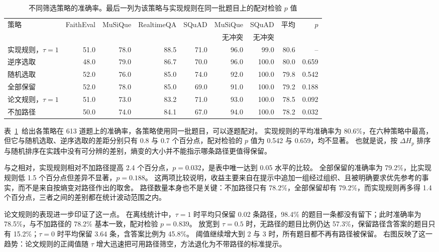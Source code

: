 \begin{table}[htbp]
  \centering
  \footnotesize
  \setlength{\tabcolsep}{4pt}
  \renewcommand{\arraystretch}{1.3}
  \caption{不同筛选策略的准确率。最后一列为该策略与实现规则在同一批题目上的配对检验 $p$ 值}
  \label{tab:cl-e2}
  \begin{tabular}{lrrrrrrrr}
    \toprule
    策略 & FaithEval & MuSiQue & RealtimeQA & SQuAD & MuSiQue & SQuAD & 平均 & $p$ \\
         &          &         &          &       & 无冲突  & 无冲突 &      &     \\
    \midrule
    实现规则，$\tau=1$ & 51.0 & 78.0 & 88.5 & 71.0 & 96.0 & 99.0 & 80.6 & -- \\
    逆序选取           & 48.0 & 79.0 & 86.7 & 70.0 & 96.0 & 100.0 & 80.0 & 0.659 \\
    随机选取           & 52.0 & 76.0 & 85.0 & 74.0 & 92.0 & 100.0 & 79.8 & 0.542 \\
    全部保留           & 52.0 & 78.0 & 85.0 & 69.0 & 91.0 & 100.0 & 79.2 & 0.188 \\
    论文规则，$\tau=1$ & 51.0 & 73.0 & 83.2 & 71.0 & 93.0 & 100.0 & 78.5 & 0.092 \\
    不加路径           & 50.0 & 74.0 & 84.1 & 67.0 & 94.0 & 100.0 & 78.2 & 0.032 \\
    \bottomrule
  \end{tabular}
\end{table}

表~\ref{tab:cl-e2}~给出各策略在 613 道题上的准确率，各策略使用同一批题目，可以逐题配对。
实现规则的平均准确率为 80.6\%，在六种策略中最高，但它与随机选取、逆序选取的差距分别只有 0.8 与 0.7 个百分点，配对检验的 $p$ 值为 0.542 与 0.659，均不显著。
也就是说，按 $\Delta H_p$ 排序与随机排序在实践中没有可分辨的差别，熵变的大小并不能指示哪条路径更值得保留。

与之相对，实现规则相对不加路径提高 2.4 个百分点，$p=0.032$，是表中唯一达到 0.05 水平的比较。
全部保留的准确率为 79.2\%，比实现规则低 1.5 个百分点但差异不显著，$p=0.188$。
这两项比较说明，收益主要来自在提示中追加一组经过组织、且被明确要求优先参考的事实，而不是来自按熵变对路径作出的取舍。
路径数量本身也不是关键：不加路径只有 78.2\%，全部保留却有 79.2\%，而实现规则再多得 1.4 个百分点，三者之间的差别都在统计波动范围之内。

论文规则的表现进一步印证了这一点。
在离线统计中，$\tau=1$ 时平均只保留 0.02 条路径，98.4\% 的题目一条都没有留下；此时准确率为 78.5\%，与不加路径的 78.2\% 基本一致，配对检验 $p=0.839$。
放宽到 $\tau=0.5$ 时，无路径的题目比例仍达 57.3\%，保留路径含答案的题目只有 15.2\%；$\tau=0$ 时平均保留 3.64 条，含答案比例为 45.8\%。
阈值继续增大到 2 与 3 时，所有题目都不再有路径被保留。
右图反映了这一趋势：论文规则的正阈值随 $\tau$ 增大迅速把可用路径筛空，方法退化为不带路径的标准提示。

